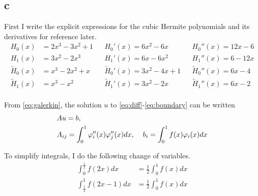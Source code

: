 \documentclass[aps, 12pt]{revtex4}
\begin{document}
\subsection*{c}
First I write the explicit expressions for the cubic Hermite polynomials and its derivatives for reference later.
\begin{align*}
    H_0(x)         & = 2x^3 - 3x^2 + 1 &  & H_0'(x) = 6x^2 - 6x         &  & H_0''(x) = 12x-6        \\
    H_1(x)         & = 3x^2-2x^3       &  & H_1'(x) = 6x-6x^2           &  & H_1''(x) = 6-12x        \\
    \tilde{H}_0(x) & = x^3-2x^2+x      &  & \tilde{H}_0'(x) = 3x^2-4x+1 &  & \tilde{H}_0''(x) = 6x-4 \\
    \tilde{H}_1(x) & = x^3-x^2         &  & \tilde{H}_1'(x) = 3x^2-2x   &  & \tilde{H}_1''(x) = 6x-2 \\
\end{align*}

From \eqref{eq:galerkin}, the solution $u$ to \eqref{eq:diff}-\eqref{eq:boundary} can be written
\begin{align*}
     & Au=b,                                                                                         \\
     & A_{ij}= \int_0^1\varphi_i''(x)\varphi_j''(x)dx, \hspace{4mm} b_i = \int_0^1f(x)\varphi_i(x)dx
\end{align*}

\newcommand{\io}{\int_0^{\frac{1}{2}}}
\renewcommand{\it}{\int_{\frac{1}{2}}^1}
\newcommand{\iu}{\frac{1}{2}\int_0^1}


To simplify integrals, I do the following change of variables.
\begin{align*}
    \io f(2x)dx   & = \iu f(x)dx
    \\
    \it f(2x-1)dx & = \iu f(x)dx
\end{align*}
\end{document}

